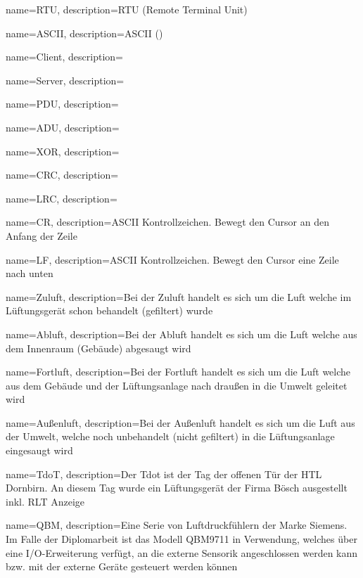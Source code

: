 {
	name=RTU,
	description={RTU (Remote Terminal Unit)}
}

{
	name=ASCII,
	description={ASCII ()}
}

{
	name=Client,
	description={}
}

{
	name=Server,
	description={}
}

{
	name=PDU,
	description={}
}

{
	name=ADU,
	description={}
}

{
	name=XOR,
	description={}
}

{
	name=CRC,
	description={}
}

{
	name=LRC,
	description={}
}

{
	name=CR,
	description={ASCII Kontrollzeichen. Bewegt den Cursor an den Anfang der Zeile}
}

{
	name=LF,
	description={ASCII Kontrollzeichen. Bewegt den Cursor eine Zeile nach unten}
}

{
	name=Zuluft,
	description={Bei der Zuluft handelt es sich um die Luft welche im Lüftungsgerät schon behandelt (gefiltert) wurde}
}

{
	name=Abluft,
	description={Bei der Abluft handelt es sich um die Luft welche aus dem Innenraum (Gebäude) abgesaugt wird}
}

{
	name=Fortluft,
	description={Bei der Fortluft handelt es sich um die Luft welche aus dem Gebäude und der Lüftungsanlage nach draußen in die Umwelt geleitet wird}
}

{
	name=Außenluft,
	description={Bei der Außenluft handelt es sich um die Luft aus der Umwelt, welche noch unbehandelt (nicht gefiltert) in die Lüftungsanlage eingesaugt wird}
}

{
	name=TdoT,
	description={Der Tdot ist der Tag der offenen Tür der HTL Dornbirn. An diesem Tag wurde ein Lüftungsgerät der Firma Bösch ausgestellt inkl. RLT Anzeige}
}

{
	name=QBM,
	description={Eine Serie von Luftdruckfühlern der Marke Siemens. Im Falle der Diplomarbeit ist das Modell QBM9711 in Verwendung, welches über eine I/O-Erweiterung verfügt, an die externe Sensorik angeschlossen werden kann bzw. mit der externe Geräte gesteuert werden können}
}

